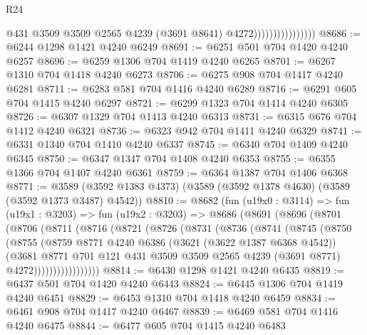 \begin{lexlean}{R24}
\begin{coremodule}
                                    @431
                                    @3509
                                    @3509
                                    @2565
                                    @4239
                                    (@3691 @8641)
                                    @4272))))))))))))))))
@8686 := @6244 @1298 @1421 @4240 @6249
@8691 := @6251 @501 @704 @1420 @4240 @6257
@8696 := @6259 @1306 @704 @1419 @4240 @6265
@8701 := @6267 @1310 @704 @1418 @4240 @6273
@8706 := @6275 @908 @704 @1417 @4240 @6281
@8711 := @6283 @581 @704 @1416 @4240 @6289
@8716 := @6291 @605 @704 @1415 @4240 @6297
@8721 := @6299 @1323 @704 @1414 @4240 @6305
@8726 := @6307 @1329 @704 @1413 @4240 @6313
@8731 := @6315 @676 @704 @1412 @4240 @6321
@8736 := @6323 @942 @704 @1411 @4240 @6329
@8741 := @6331 @1340 @704 @1410 @4240 @6337
@8745 := @6340 @704 @1409 @4240 @6345
@8750 := @6347 @1347 @704 @1408 @4240 @6353
@8755 := @6355 @1366 @704 @1407 @4240 @6361
@8759 := @6364 @1387 @704 @1406 @6368
@8771 := @3589 (@3592 @1383 @4373) (@3589 (@3592 @1378 @4630) (@3589 (@3592 @1373 @3487) @4542))
@8810 := @8682
    (fun (u19x0 : @3114) =>
    fun (u19x1 : @3203) =>
    fun (u19x2 : @3203) =>
    @8686
      (@8691
        (@8696
          (@8701
            (@8706
              (@8711
                (@8716
                  (@8721
                    (@8726
                      (@8731
                        (@8736
                          (@8741
                            (@8745
                              (@8750
                                (@8755
                                  (@8759
                                    @8771
                                    @4240
                                    @6386
                                    (@3621 (@3622 @1387 @6368 @4542))
                                    (@3681
                                      @8771
                                      @701
                                      @121
                                      @431
                                      @3509
                                      @3509
                                      @2565
                                      @4239
                                      (@3691 @8771)
                                      @4272)))))))))))))))))
@8814 := @6430 @1298 @1421 @4240 @6435
@8819 := @6437 @501 @704 @1420 @4240 @6443
@8824 := @6445 @1306 @704 @1419 @4240 @6451
@8829 := @6453 @1310 @704 @1418 @4240 @6459
@8834 := @6461 @908 @704 @1417 @4240 @6467
@8839 := @6469 @581 @704 @1416 @4240 @6475
@8844 := @6477 @605 @704 @1415 @4240 @6483

\end{coremodule}
\end{lexlean}
